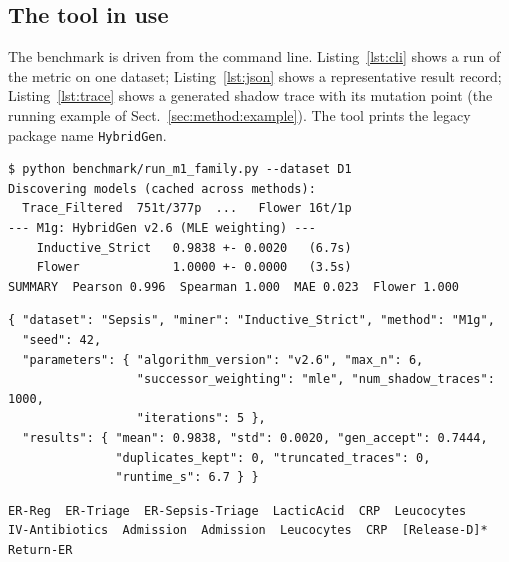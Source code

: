 \documentclass[runningheads]{llncs}
\begin{document}
\subsection{The tool in use}
\label{sec:impl:tool}
The benchmark is driven from the command line. Listing~\ref{lst:cli} shows a run of the metric on one dataset; Listing~\ref{lst:json} shows a representative result record; Listing~\ref{lst:trace} shows a generated shadow trace with its mutation point (the running example of Sect.~\ref{sec:method:example}). The tool prints the legacy package name \texttt{HybridGen}.

\begin{lstlisting}[caption={Running the metric over all miners on D1.},label={lst:cli}]
$ python benchmark/run_m1_family.py --dataset D1
Discovering models (cached across methods):
  Trace_Filtered  751t/377p  ...   Flower 16t/1p
--- M1g: HybridGen v2.6 (MLE weighting) ---
    Inductive_Strict   0.9838 +- 0.0020   (6.7s)
    Flower             1.0000 +- 0.0000   (3.5s)
SUMMARY  Pearson 0.996  Spearman 1.000  MAE 0.023  Flower 1.000
\end{lstlisting}

\begin{lstlisting}[caption={Sidecar config JSON for one cell (abridged).},label={lst:json}]
{ "dataset": "Sepsis", "miner": "Inductive_Strict", "method": "M1g",
  "seed": 42,
  "parameters": { "algorithm_version": "v2.6", "max_n": 6,
                  "successor_weighting": "mle", "num_shadow_traces": 1000,
                  "iterations": 5 },
  "results": { "mean": 0.9838, "std": 0.0020, "gen_accept": 0.7444,
               "duplicates_kept": 0, "truncated_traces": 0,
               "runtime_s": 6.7 } }
\end{lstlisting}

\begin{lstlisting}[caption={A generated shadow trace; the starred event is the Katz-consistent mutation.},label={lst:trace}]
ER-Reg  ER-Triage  ER-Sepsis-Triage  LacticAcid  CRP  Leucocytes
IV-Antibiotics  Admission  Admission  Leucocytes  CRP  [Release-D]*  Return-ER
\end{lstlisting}
\end{document}

